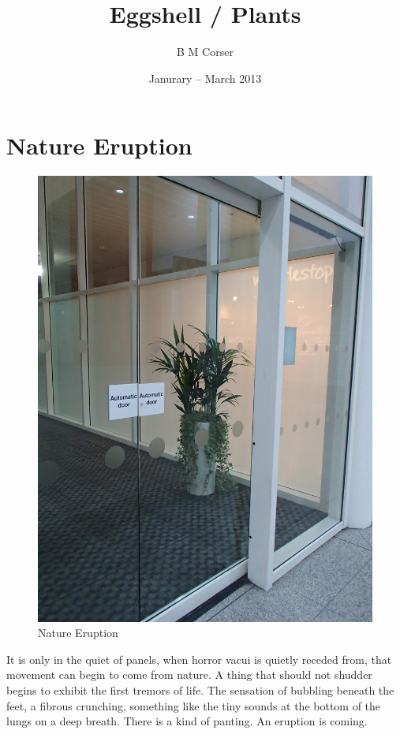\documentclass{article}
\title{Eggshell / Plants}
\author{B M Corser}
\date{Janurary -- March 2013}
\begin{document}
\maketitle

\tableofcontents

\chapter{Nature Eruption}

\begin{figure}
\centering
\includegraphics[width=\textwidth,angle=90]{figures/P1050140.JPG}
\caption{Nature Eruption}
\end{figure}

It is only in the quiet of panels, when horror vacui is quietly receded from,
that movement can begin to come from nature. A thing that should not shudder
begins to exhibit the first tremors of life. The sensation of bubbling beneath
the feet, a fibrous crunching, something like the tiny sounds at the bottom of
the lungs on a deep breath.  There is a kind of panting. An eruption is coming.
\end{document}
